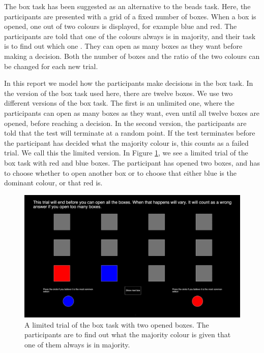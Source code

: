 The box task has been suggested as an alternative to the beads task. Here, the participants are presented with a grid of a fixed number of boxes. When a box is opened, one out of two colours is displayed, for example blue and red. The participants are told that one of the colours always is in majority, and their task is to find out which one \citep{moritz2017}. They can open as many boxes as they want before making a decision. Both the number of boxes and the ratio of the two colours can be changed for each new trial. 

In this report we model how the participants make decisions in the box task. In the version of the box task used here, there are twelve boxes. We use two different versions of the box task. The first is an unlimited one, where the participants can open as many boxes as they want, even until all twelve boxes are opened, before reaching a decision. In the second version, the participants are told that the test will terminate at a random point. If the test terminates before the participant has decided what the majority colour is, this counts as a failed trial. We call this the limited version. In Figure \ref{picture_of_box_task}, we see a limited trial of the box task with red and blue boxes. The participant has opened two boxes, and has to choose whether to open another box or to choose that either blue is the dominant colour, or that red is. 
\begin{figure}
    \centering
    \includegraphics[scale=0.486]{Sections/Box task 2.png}
    \caption[A Limited Trial of the Box Task Visualised]{A limited trial of the box task with two opened boxes. The participants are to find out what the majority colour is given that one of them always is in majority.}
    \label{picture_of_box_task}
\end{figure}

